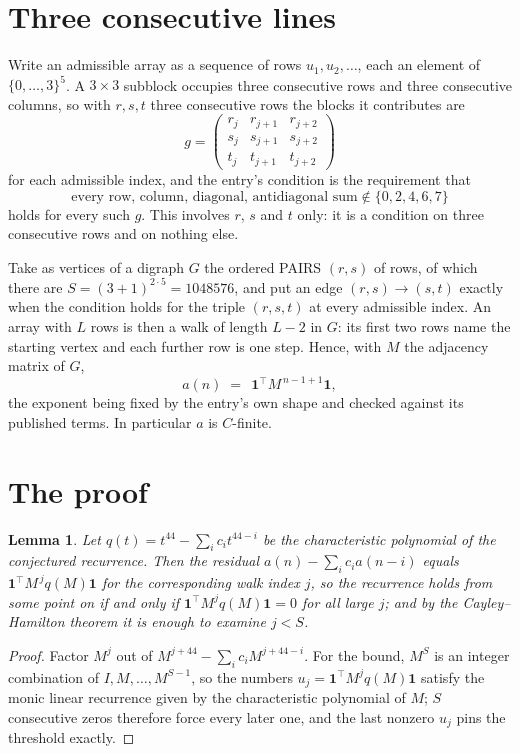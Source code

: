 \documentclass[11pt,a4paper]{article}
\theoremstyle{plain}
\newtheorem{lemma}[theorem]{Lemma}
\theoremstyle{definition}
\begin{document}
\section{Three consecutive lines}

Write an admissible array as a sequence of rows $u_1,u_2,\dots$, each an element of
$\{0,\dots,3\}^{5}$. A $3\times3$ subblock occupies three consecutive rows and
three consecutive columns, so with $r,s,t$ three consecutive rows the blocks it
contributes are
\[
g=\begin{pmatrix}r_j&r_{j+1}&r_{j+2}\\ s_j&s_{j+1}&s_{j+2}\\ t_j&t_{j+1}&t_{j+2}\end{pmatrix}
\]
for each admissible index, and the entry's condition is the requirement that
\[
\text{every row, column, diagonal, antidiagonal sum} \notin \{0,2,4,6,7\}
\]
holds for every such $g$. This involves $r$, $s$ and $t$ only: it is a condition on
three consecutive rows and on nothing else.

Take as vertices of a digraph $G$ the ordered PAIRS $(r,s)$ of rows, of which there are
$S=(3+1)^{2\cdot5}=1048576$, and put an edge $(r,s)\to(s,t)$ exactly when the condition
holds for the triple $(r,s,t)$ at every admissible index. An array with $L$ rows is then a
walk of length $L-2$ in $G$: its first two rows name the starting vertex and each further
row is one step. Hence, with $M$ the adjacency matrix of $G$,
\[
a(n)\;=\;\,\mathbf{1}^{\!\top}M^{\,n-1+1}\mathbf{1},
\]
the exponent being fixed by the entry's own shape and checked against its published terms.
In particular $a$ is $C$-finite.

\section{The proof}

\begin{lemma}\label{lem:crit}
Let $q(t)=t^{44}-\sum_i c_it^{44-i}$ be the characteristic polynomial of the
conjectured recurrence. Then the residual $a(n)-\sum_ic_ia(n-i)$ equals
$\mathbf{1}^{\!\top}M^{\,j}q(M)\mathbf{1}$ for the corresponding walk index
$j$, so the recurrence holds from some point on if and only if
$\mathbf{1}^{\!\top}M^{j}q(M)\mathbf{1}=0$ for all large $j$; and by the
Cayley--Hamilton theorem it is enough to examine $j<S$.
\end{lemma}

\begin{proof}
Factor $M^{j}$ out of $M^{j+44}-\sum_ic_iM^{j+44-i}$. For the bound, $M^{S}$
is an integer combination of $I,M,\dots,M^{S-1}$, so the numbers
$u_j=\mathbf{1}^{\!\top}M^{j}q(M)\mathbf{1}$ satisfy the monic linear recurrence given by
the characteristic polynomial of $M$; $S$ consecutive zeros therefore force every later one,
and the last nonzero $u_j$ pins the threshold exactly.
\end{proof}
\end{document}
